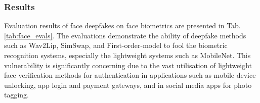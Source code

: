 \subsubsection{Results} 
Evaluation results of face deepfakes on face biometrics are presented in Tab. \ref{tab:face_evals}. The evaluations demonstrate the ability of deepfake methods such as Wav2Lip, SimSwap, and First-order-model to fool the biometric recognition systems, especially the lightweight systems such as MobileNet. This vulnerability is significantly concerning due to the vast utilisation of lightweight face verification methods for authentication in applications such as mobile device unlocking, app login and payment gateways, and in social media apps for photo tagging. 

\begin{table*}[htbp]
\caption{Evaluation of the efficacy of face deepfakes to thwart face biometrics systems. We evaluate both face swap methods (SimSwap, and FSGAN) and face reenactment methods (Wav2Lip, MCNet, and First Order Motion Model).}
\label{tab:face_evals}
\end{table*}
